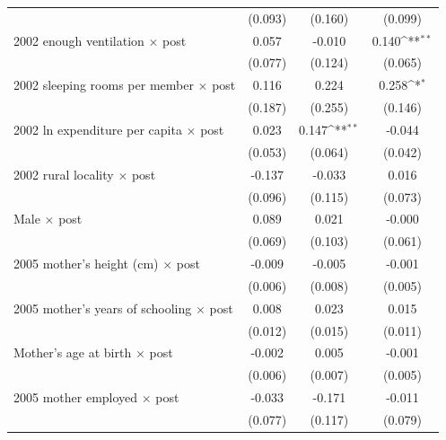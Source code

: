 \documentclass[12pt]{article}
\def\sym#1{\ifmmode^{#1}\else\(^{#1}\)\fi}
\begin{document}
\begin{longtable}{p{}ccc}
            &     (0.093)         &     (0.160)         &     (0.099)         \\
2002 enough ventilation \ensuremath{\times} post&       0.057         &      -0.010         &       0.140\sym{**} \\
            &     (0.077)         &     (0.124)         &     (0.065)         \\
2002 sleeping rooms per member \ensuremath{\times} post&       0.116         &       0.224         &       0.258\sym{*}  \\
            &     (0.187)         &     (0.255)         &     (0.146)         \\
2002 ln expenditure per capita \ensuremath{\times} post&       0.023         &       0.147\sym{**} &      -0.044         \\
            &     (0.053)         &     (0.064)         &     (0.042)         \\
2002 rural locality \ensuremath{\times} post&      -0.137         &      -0.033         &       0.016         \\
            &     (0.096)         &     (0.115)         &     (0.073)         \\
Male \ensuremath{\times} post&       0.089         &       0.021         &      -0.000         \\
            &     (0.069)         &     (0.103)         &     (0.061)         \\
2005 mother's height (cm) \ensuremath{\times} post&      -0.009         &      -0.005         &      -0.001         \\
            &     (0.006)         &     (0.008)         &     (0.005)         \\
2005 mother's years of schooling \ensuremath{\times} post&       0.008         &       0.023         &       0.015         \\
            &     (0.012)         &     (0.015)         &     (0.011)         \\
Mother's age at birth \ensuremath{\times} post&      -0.002         &       0.005         &      -0.001         \\
            &     (0.006)         &     (0.007)         &     (0.005)         \\
2005 mother employed \ensuremath{\times} post&      -0.033         &      -0.171         &      -0.011         \\
            &     (0.077)         &     (0.117)         &     (0.079)         \\

\end{longtable}
\end{document}
